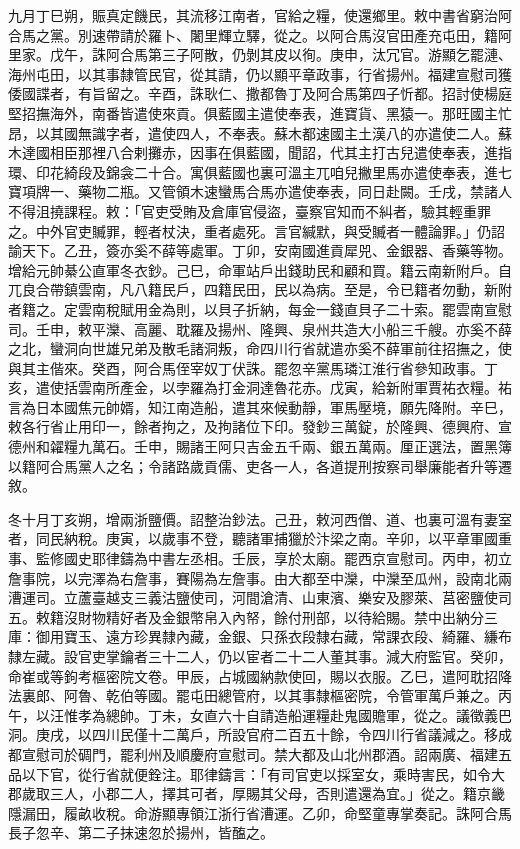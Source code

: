 \begin{pinyinscope}
 九月丁巳朔，賑真定饑民，其流移江南者，官給之糧，使還鄉里。敕中書省窮治阿合馬之黨。別速帶請於羅卜、闍里輝立驛，從之。以阿合馬沒官田產充屯田，籍阿里家。戊午，誅阿合馬第三子阿散，仍剝其皮以徇。庚申，汰冗官。游顯乞罷漣、海州屯田，以其事隸管民官，從其請，仍以顯平章政事，行省揚州。福建宣慰司獲倭國諜者，有旨留之。辛酉，誅耿仁、撒都魯丁及阿合馬第四子忻都。招討使楊庭堅招撫海外，南番皆遣使來貢。俱藍國主遣使奉表，進寶貨、黑猿一。那旺國主忙昂，以其國無識字者，遣使四人，不奉表。蘇木都速國主土漢八的亦遣使二人。蘇木達國相臣那裡八合剌攤赤，因事在俱藍國，聞詔，代其主打古兒遣使奉表，進指環、印花綺段及錦衾二十合。寓俱藍國也裏可溫主兀咱兒撇里馬亦遣使奉表，進七寶項牌一、藥物二瓶。又管領木速蠻馬合馬亦遣使奉表，同日赴闕。壬戌，禁諸人不得沮撓課程。敕：「官吏受賄及倉庫官侵盜，臺察官知而不糾者，驗其輕重罪之。中外官吏贓罪，輕者杖決，重者處死。言官緘默，與受贓者一體論罪。」仍詔諭天下。乙丑，簽亦奚不薛等處軍。丁卯，安南國進貢犀兕、金銀器、香藥等物。增給元帥綦公直軍冬衣鈔。己巳，命軍站戶出錢助民和顧和買。籍云南新附戶。自兀良合帶鎮雲南，凡八籍民戶，四籍民田，民以為病。至是，令已籍者勿動，新附者籍之。定雲南稅賦用金為則，以貝子折納，每金一錢直貝子二十索。罷雲南宣慰司。壬申，敕平灤、高麗、耽羅及揚州、隆興、泉州共造大小船三千艘。亦奚不薛之北，蠻洞向世雄兄弟及散毛諸洞叛，命四川行省就遣亦奚不薛軍前往招撫之，使與其主偕來。癸酉，阿合馬侄宰奴丁伏誅。罷忽辛黨馬璘江淮行省參知政事。丁亥，遣使括雲南所產金，以孛羅為打金洞達魯花赤。戊寅，給新附軍賈祐衣糧。祐言為日本國焦元帥婿，知江南造船，遣其來候動靜，軍馬壓境，願先降附。辛巳，敕各行省止用印一，餘者拘之，及拘諸位下印。發鈔三萬錠，於隆興、德興府、宣德州和糴糧九萬石。壬申，賜諸王阿只吉金五千兩、銀五萬兩。厘正選法，置黑簿以籍阿合馬黨人之名；令諸路歲貢儒、吏各一人，各道提刑按察司舉廉能者升等遷敘。



 冬十月丁亥朔，增兩浙鹽價。詔整治鈔法。己丑，敕河西僧、道、也裏可溫有妻室者，同民納稅。庚寅，以歲事不登，聽諸軍捕獵於汴梁之南。辛卯，以平章軍國重事、監修國史耶律鑄為中書左丞相。壬辰，享於太廟。罷西京宣慰司。丙申，初立詹事院，以完澤為右詹事，賽陽為左詹事。由大都至中灤，中灤至瓜州，設南北兩漕運司。立蘆臺越支三義沽鹽使司，河間滄清、山東濱、樂安及膠萊、莒密鹽使司五。敕籍沒財物精好者及金銀幣帛入內帑，餘付刑部，以待給賜。禁中出納分三庫：御用寶玉、遠方珍異隸內藏，金銀、只孫衣段隸右藏，常課衣段、綺羅、縑布隸左藏。設官吏掌鑰者三十二人，仍以宦者二十二人董其事。減大府監官。癸卯，命崔或等鉤考樞密院文卷。甲辰，占城國納款使回，賜以衣服。乙巳，遣阿耽招降法裏郎、阿魯、乾伯等國。罷屯田總管府，以其事隸樞密院，令管軍萬戶兼之。丙午，以汪惟孝為總帥。丁未，女直六十自請造船運糧赴鬼國贍軍，從之。議徵義巴洞。庚戌，以四川民僅十二萬戶，所設官府二百五十餘，令四川行省議減之。移成都宣慰司於碉門，罷利州及順慶府宣慰司。禁大都及山北州郡酒。詔兩廣、福建五品以下官，從行省就便銓注。耶律鑄言：「有司官吏以採室女，乘時害民，如令大郡歲取三人，小郡二人，擇其可者，厚賜其父母，否則遣還為宜。」從之。籍京畿隱漏田，履畝收稅。命游顯專領江浙行省漕運。乙卯，命堅童專掌奏記。誅阿合馬長子忽辛、第二子抹速忽於揚州，皆醢之。




\end{pinyinscope}
